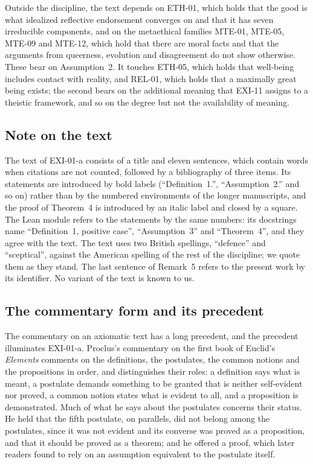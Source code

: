 Outside the discipline, the text depends on ETH-01, which holds that the good is what idealized reflective endorsement converges on and that it has seven irreducible components, and on the metaethical families MTE-01, MTE-05, MTE-09 and MTE-12, which hold that there are moral facts and that the arguments from queerness, evolution and disagreement do not show otherwise. These bear on Assumption~2. It touches ETH-05, which holds that well-being includes contact with reality, and REL-01, which holds that a maximally great being exists; the second bears on the additional meaning that EXI-11 assigns to a theistic framework, and so on the degree but not the availability of meaning.

\subsection{Note on the text}

The text of EXI-01-a consists of a title and eleven sentences, which contain \cnTokens{} words when citations are not counted, followed by a bibliography of three items. Its statements are introduced by bold labels (\enquote{Definition~1.}, \enquote{Assumption~2.} and so on) rather than by the numbered environments of the longer manuscripts, and the proof of Theorem~4 is introduced by an italic label and closed by a square. The Lean module refers to the statements by the same numbers: its docstrings name \enquote{Definition~1, positive case}, \enquote{Assumption~3} and \enquote{Theorem~4}, and they agree with the text. The text uses two British spellings, \enquote{defence} and \enquote{sceptical}, against the American spelling of the rest of the discipline; we quote them as they stand. The last sentence of Remark~5 refers to the present work by its identifier. No variant of the text is known to us.

\subsection{The commentary form and its precedent}

The commentary on an axiomatic text has a long precedent, and the precedent illuminates EXI-01-a. Proclus's commentary on the first book of Euclid's \emph{Elements} \citep{Proclus1970} comments on the definitions, the postulates, the common notions and the propositions in order, and distinguishes their roles: a definition says what is meant, a postulate demands something to be granted that is neither self-evident nor proved, a common notion states what is evident to all, and a proposition is demonstrated. Much of what he says about the postulates concerns their status. He held that the fifth postulate, on parallels, did not belong among the postulates, since it was not evident and its converse was proved as a proposition, and that it should be proved as a theorem; and he offered a proof, which later readers found to rely on an assumption equivalent to the postulate itself.

